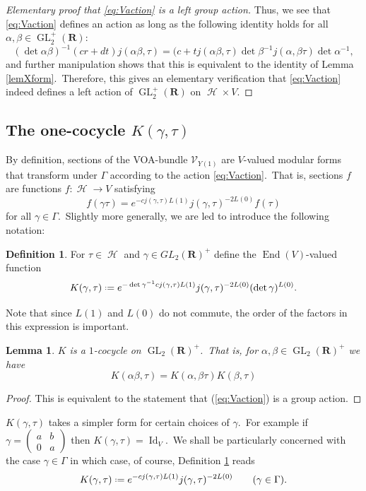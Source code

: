 \documentclass[12pt]{amsart}
\theoremstyle{plain}
\newtheorem{lem}[thm]{Lemma}
\theoremstyle{definition}
\newtheorem{dfn}[thm]{Definition}
\theoremstyle{remark}
\newcommand{\cV}{\mathcal{V}}
\DeclareMathOperator{\uhp}{\mathcal{H}}
\DeclareMathOperator{\Endo}{End}
\DeclareMathOperator{\GL}{GL}
\newcommand*{\df}{\mathrel{\vcenter{\baselineskip0.5ex \lineskiplimit0pt
                     \hbox{\scriptsize.}\hbox{\scriptsize.}}} =}
\providecommand{\stwomat}[4]{\left(\begin{smallmatrix}#1&#2\\#3&#4\end{smallmatrix}\right)}
\newcommand{\RR}{\mathbf{R}}
\DeclareMathOperator{\Id}{Id}
\begin{document}
\begin{proof}[Elementary proof that \eqref{eq:Vaction} is a left group action]
Thus, we see that \eqref{eq:Vaction} defines an action as long as the following identity holds for all $\alpha,\beta \in \GL_2^+(\RR)$:
\[
(\det\alpha\beta)^{-1}(cr+dt)j(\alpha\beta,\tau) = (c+tj(\alpha\beta,\tau)\det\beta^{-1}j(\alpha,\beta\tau)\det\alpha^{-1},
\]
and further manipulation shows that this is equivalent to the identity of Lemma
\ref{lemXform}.\ Therefore, this gives an elementary verification that \eqref{eq:Vaction} indeed defines a left action of $\GL_2^+(\RR)$ on $\uhp \times V$.
\end{proof}

\subsection{The one-cocycle \texorpdfstring{$K(\gamma, \tau)$}{K}}
    By definition, sections of the VOA-bundle $\cV_{Y(1)}$ are $V$-valued modular forms that transform under 
    $\Gamma$ according to the action \eqref{eq:Vaction}.\ That is, sections $f$ are functions $f\colon \uhp \to V$ satisfying
    \[
    f(\gamma \tau) = e^{-cj(\gamma,\tau)L(1)}j(\gamma,\tau)^{-2L(0)}f(\tau)
    \]
    for all $\gamma \in \Gamma$.\ Slightly more generally, we are led to introduce the following notation:
    \begin{dfn}\label{dfnK}
        For $\tau \in \uhp$ and $\gamma \in GL_2(\RR)^+$ define the $\Endo(V)$-valued function
        \[
          K(\gamma,\tau) \df e^{-\det\gamma^{-1}cj(\gamma,\tau)L(1)}j(\gamma,\tau)^{-2L(0)} (\det\gamma)^{L(0)}.
        \]
    \end{dfn}

Note that since $L(1)$ and $L(0)$ do not commute, the order of the factors in this expression is important. 
    \begin{lem}\label{lemK1} $K$ is a $1$-cocycle on $\GL_2(\RR)^+$.\ That is, for $\alpha, \beta \in \GL_2(\RR)^+$ we have
    $$ K(\alpha \beta, \tau)=K(\alpha, \beta\tau)K(\beta, \tau)$$
    \end{lem}
    \begin{proof}
       This is equivalent to the statement that (\ref{eq:Vaction}) is a group action. 
    \end{proof}
    

$K(\gamma, \tau)$ takes a simpler form for certain choices of $\gamma$.\ For example if 
    $\gamma= \stwomat ab0a$ then $K(\gamma, \tau)=\Id_V$.\ We shall be particularly concerned with the case $\gamma\in \Gamma$ in which case, of course, Definition \ref{dfnK} reads
    \[
          K(\gamma,\tau) \df e^{-cj(\gamma,\tau)L(1)}j(\gamma,\tau)^{-2L(0)}\quad\quad (\gamma\in\Gamma).
        \]
\end{document}
